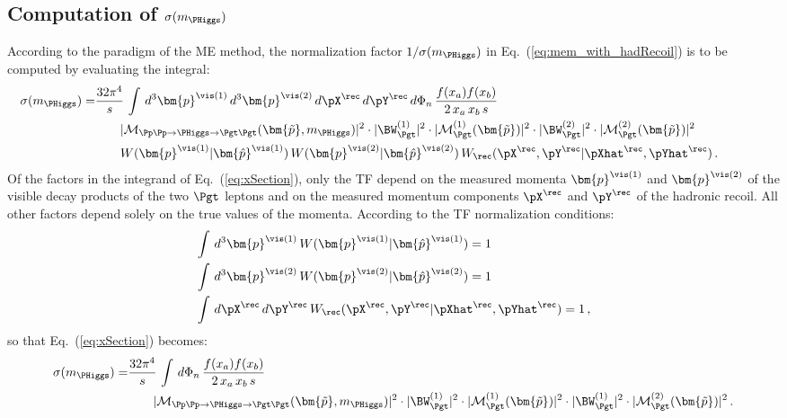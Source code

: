 \subsection{Computation of $\sigma(m_{\PHiggs})$}
\label{sec:mem_xSection}

According to the paradigm of the ME method, the normalization factor
$1/\sigma(m_{\PHiggs})$ in Eq.~(\ref{eq:mem_with_hadRecoil}) is to be computed
by evaluating the integral:
\begin{align}
\sigma(m_{\PHiggs}) = &
  \frac{32\pi^{4}}{s} \, \int \, d^{3}\bm{p}^{\vis(1)} \, d^{3}\bm{p}^{\vis(2)} \, d\pX^{\rec} \, d\pY^{\rec} \, 
  d\Phi_{n} \, \frac{f(x_{a}) f(x_{b})}{2 \, x_{a} \, x_{b} \, s} \, \hspace{2cm} \nonumber \\
& \qquad \vert \mathcal{M}_{\Pp\Pp \to \PHiggs \to \Pgt\Pgt}(\bm{\tilde{p}},m_{\PHiggs}) \vert^{2} 
  \cdot \vert \BW^{(1)}_{\Pgt} \vert^{2} \cdot \vert \mathcal{M}^{(1)}_{\Pgt}(\bm{\tilde{p}}) \vert^{2} 
  \cdot \vert \BW^{(2)}_{\Pgt} \vert^{2} \cdot \vert \mathcal{M}^{(2)}_{\Pgt}(\bm{\tilde{p}}) \vert^{2} \hspace{2cm} \nonumber \\
& \qquad W(\bm{p}^{\vis(1)}|\bm{\hat{p}}^{\vis(1)}) \, W(\bm{p}^{\vis(2)}|\bm{\hat{p}}^{\vis(2)}) \, W_{\rec}( \pX^{\rec},\pY^{\rec} | \pXhat^{\rec},\pYhat^{\rec} ) \, .
\label{eq:xSection}
\end{align}
Of the factors in the integrand of Eq.~(\ref{eq:xSection}),
only the TF depend on the measured momenta $\bm{p}^{\vis(1)}$ and $\bm{p}^{\vis(2)}$ of the visible decay products of the two $\Pgt$ leptons
and on the measured momentum components $\pX^{\rec}$ and $\pY^{\rec}$ of the hadronic recoil.
All other factors depend solely on the true values of the momenta.
According to the TF normalization conditions:
\begin{align}
& \int \, d^{3}\bm{p}^{\vis(1)} \, W(\bm{p}^{\vis(1)}|\bm{\hat{p}}^{\vis(1)}) = 1 \nonumber \\
& \int \, d^{3}\bm{p}^{\vis(2)} \, W(\bm{p}^{\vis(2)}|\bm{\hat{p}}^{\vis(2)}) = 1 \nonumber \\
& \int \, d\pX^{\rec} \, d\pY^{\rec} \, W_{\rec}( \pX^{\rec},\pY^{\rec} | \pXhat^{\rec},\pYhat^{\rec} ) = 1 \, ,
\end{align}
so that Eq.~(\ref{eq:xSection}) becomes:
\begin{align}
\sigma(m_{\PHiggs}) = &
  \frac{32\pi^{4}}{s} \, \int \, 
  d\Phi_{n} \, \frac{f(x_{a}) f(x_{b})}{2 \, x_{a} \, x_{b} \, s} \,
  \hspace{2cm} \nonumber \\
& \qquad \vert \mathcal{M}_{\Pp\Pp \to \PHiggs \to
    \Pgt\Pgt}(\bm{\tilde{p}},m_{\PHiggs}) \vert^{2} 
  \cdot \vert \BW^{(1)}_{\Pgt} \vert^{2} \cdot \vert \mathcal{M}^{(1)}_{\Pgt}(\bm{\tilde{p}}) \vert^{2} 
  \cdot \vert \BW^{(1)}_{\Pgt} \vert^{2} \cdot \vert \mathcal{M}^{(2)}_{\Pgt}(\bm{\tilde{p}}) \vert^{2} \, .
\label{eq:xSection2}
\end{align}

